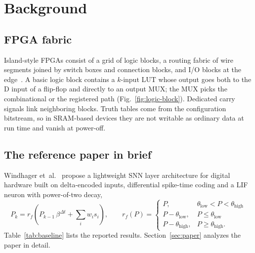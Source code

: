\section{Background}
\label{sec:background}

\subsection{FPGA fabric}
Island-style FPGAs consist of a grid of logic blocks, a routing fabric of wire segments joined by switch boxes and connection blocks, and I/O blocks at the edge~\cite{boutros2021,kuon2008,betz1999}. A basic logic block contains a $k$-input LUT whose output goes both to the D input of a flip-flop and directly to an output MUX; the MUX picks the combinational or the registered path (Fig.~\ref{fig:logic-block}). Dedicated carry signals link neighboring blocks. Truth tables come from the configuration bitstream, so in SRAM-based devices they are not writable as ordinary data at run time and vanish at power-off.

\subsection{The reference paper in brief}
Windhager et~al.~\cite{windhager2024} propose a lightweight SNN layer architecture for digital hardware built on delta-encoded inputs, differential spike-time coding and a LIF neuron with power-of-two decay,
\begin{equation}
P_k = r_f\!\left(P_{k-1}\,\beta^{\Delta t} + \sum_i w_i s_i\right),
\qquad
r_f(P)=
\begin{cases}
P, & \theta_{\text{low}}<P<\theta_{\text{high}}\\
P-\theta_{\text{low}}, & P\le\theta_{\text{low}}\\
P-\theta_{\text{high}}, & P\ge\theta_{\text{high}}.
\end{cases}
\label{eq:lif}
\end{equation}
Table~\ref{tab:baseline} lists the reported results. Section~\ref{sec:paper} analyzes the paper in detail.

